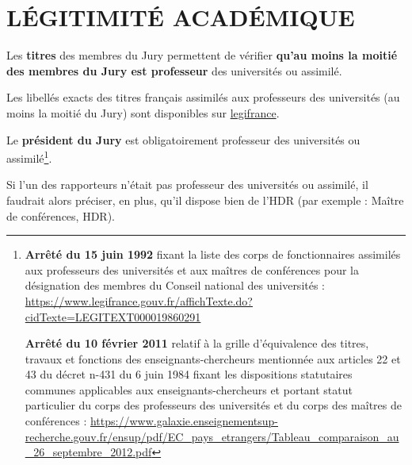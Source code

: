 \documentclass[french,12pt,a4paper]{book}
\begin{document}
\section{LÉGITIMITÉ ACADÉMIQUE}
Les \textbf{titres}  des membres du Jury permettent de vérifier \textbf{qu’au moins la moitié des membres du Jury est professeur} des universités ou assimilé.\\ \par
Les libellés exacts des titres français assimilés aux professeurs des universités (au moins la moitié du Jury) sont disponibles sur \href{https://www.legifrance.gouv.fr/loda/id/LEGITEXT000019860291/}{legifrance}.\\ \par
Le \textbf{président du Jury} est obligatoirement professeur des universités ou assimilé\footnote{\textbf{Arrêté du 15 juin 1992} fixant la liste des corps de fonctionnaires assimilés aux professeurs des universités et aux maîtres de conférences pour la désignation des membres du Conseil national des universités : \url{https://www.legifrance.gouv.fr/affichTexte.do?cidTexte=LEGITEXT000019860291}\\ \par
	\textbf{Arrêté du 10 février 2011} relatif à la grille d'équivalence des titres, travaux et fonctions des enseignants-chercheurs mentionnée aux articles 22 et 43 du décret n-431 du 6 juin 1984 fixant les dispositions statutaires communes applicables aux enseignants-chercheurs et portant statut particulier du corps des professeurs des universités et du corps des maîtres de conférences : \url{https://www.galaxie.enseignementsup-recherche.gouv.fr/ensup/pdf/EC_pays_etrangers/Tableau_comparaison_au_26_septembre_2012.pdf}}.\\ \par
Si l’un des rapporteurs n’était pas professeur des universités ou assimilé, il faudrait alors préciser, en plus, qu’il dispose bien de l’HDR (par exemple : Maître de conférences, HDR).
\end{document}
